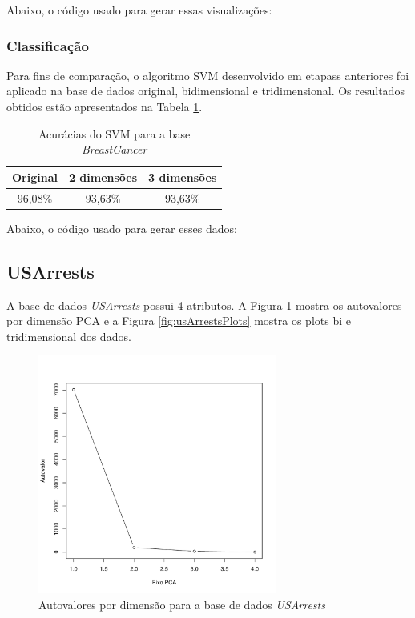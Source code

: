 \documentclass[a4paper]{article}
\begin{document}
Abaixo, o código usado para gerar essas visualizações:



\subsubsection{Classificação}

Para fins de comparação, o algoritmo SVM desenvolvido em etapass anteriores foi aplicado na base de dados original, bidimensional e tridimensional. Os resultados obtidos estão apresentados na Tabela \ref{tab:breastCancer}.

\begin{table}[H]
	\centering
	\caption{Acurácias do SVM para a base \textit{BreastCancer}}
	\thinspace
	\label{tab:breastCancer}
\begin{tabular}{ c | c | c }
	Original & 2 dimensões & 3 dimensões\\
	\hline
	96,08\% & 93,63\% & 93,63\% \\
\end{tabular}
\end{table}

Abaixo, o código usado para gerar esses dados:



\newpage
\subsection{USArrests}

A base de dados \textit{USArrests} possui 4 atributos. A Figura \ref{fig:usArrestsAuto} mostra os autovalores por dimensão PCA e a Figura \ref{fig:usArrestsPlots} mostra os plots bi e tridimensional dos dados.

\begin{figure}[H]
	\centering
	\includegraphics[page=1,width=0.7\textwidth]{../usArrests.pdf}
	\caption{Autovalores por dimensão para a base de dados \textit{USArrests}}
	\label{fig:usArrestsAuto}
\end{figure}
\end{document}
